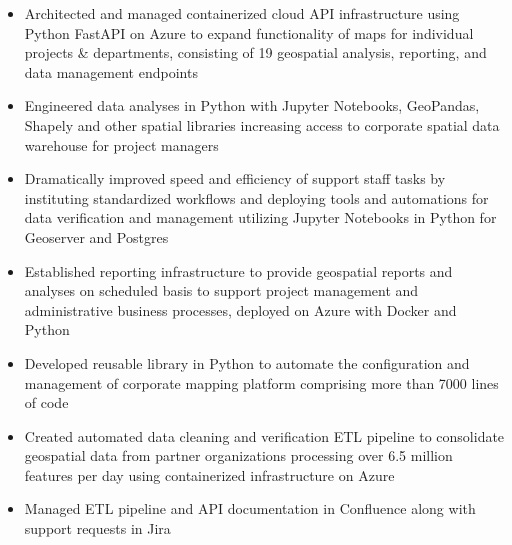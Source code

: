 \documentclass[letterpaper]{article}
\newenvironment{jobtasklist}
        {
            \vspace{-12pt}
            \begin{itemize} \itemsep 0pt
        }{
            \end{itemize}
            \vspace{-3pt}
        }
\begin{document}
\begin{jobtasklist}
    \item Architected and managed containerized cloud API infrastructure using
        Python FastAPI on Azure to expand functionality of maps for
        individual projects \& departments, consisting of 19 geospatial analysis,
        reporting, and data management endpoints

    \item Engineered data analyses in Python with Jupyter Notebooks, GeoPandas, Shapely
            and other spatial libraries
            increasing access to corporate spatial data warehouse for project managers

%

    \item Dramatically improved speed and efficiency of support staff tasks
            by instituting standardized workflows and
            deploying tools and automations for data verification and management
            utilizing Jupyter Notebooks in Python for Geoserver and Postgres

    \item Established reporting infrastructure
            to provide geospatial reports and analyses on
            scheduled basis to support project management and administrative business processes,
            deployed on Azure with Docker and Python

    \item Developed reusable library in Python to automate the configuration and management of
            corporate mapping platform comprising more than 7000 lines of code

    \item Created automated data cleaning and verification ETL pipeline to consolidate geospatial data
            from partner organizations processing over 6.5 million features per day
            using containerized infrastructure on Azure

    \item Managed ETL pipeline and API documentation in Confluence along with support requests in Jira

\end{jobtasklist}
\end{document}
